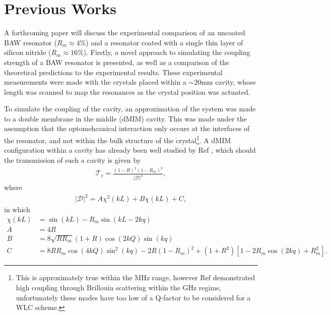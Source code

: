\documentclass[aps,  
                a4paper, 
                amsmath, 
                amssymb, 
                preprint,
                tightenlines,  
                amsfonts,
                nofootinbib,
                onecolumn,
                titlepage,
                10pt
            ]{revtex4-2}
\begin{document}
    \section{Previous Works}
    A forthcoming paper will discuss the experimental comparison of an uncoated BAW resonator ($R_m\approx4\%$) and a resonator coated with a single thin layer of silicon nitride ($R_m\approx16\%$). Firstly, a novel approach to simulating the coupling strength of a BAW resonator is presented, as well as a comparison of the theoretical predictions to the experimental results. These experimental measurements were made with the crystals placed within a $\sim20$mm cavity, whose length was scanned to map the resonances as the crystal position was actuated. 

    To simulate the coupling of the cavity, an approximation of the system was made to a double membrane in the middle (dMIM) cavity. This was made under the assumption that the optomehcanical interaction only occurs at the interfaces of the resonator, and not within the bulk structure of the crystal\footnote{This is approximately true within the MHz range, however Ref \cite{kharel2019} demonstrated high coupling through Brillouin scattering within the GHz regime, unfortunately these modes have too low of a Q-factor to be considered for a WLC scheme.}. A dMIM configuration within a cavity has already been well studied by Ref \cite{li2016}, which should the transmission of such a cavity is given by
    \begin{align}
        \label{eq:transmission-dmim}
        \mathcal{T}_c=\frac{(1-R)^2(1-R_m)^2}{\vert\mathcal{D}\vert^2},
    \end{align} 
    where
    \begin{align}
        \label{eq:transmission-dmim-denom}
        \vert\mathcal{D}\vert^2=A\chi^2(kL)+B\chi(kL)+C,
    \end{align}
    in which
    \begin{align}
        \chi(kL)&=\sin({kL})-R_m\sin{(kL-2kq)}\nonumber\\
        A&=4R\nonumber\\
        B&=8\sqrt{RR_m}(1+R)\cos{(2kQ)}\sin{(kq)}\nonumber\\
        C&=8RR_m\cos(4kQ)\sin^2(kq)-2R(1-R_m)^2+(1+R^2)[1-2R_m\cos(2kq)+R_m^2].
    \end{align}
\end{document}
